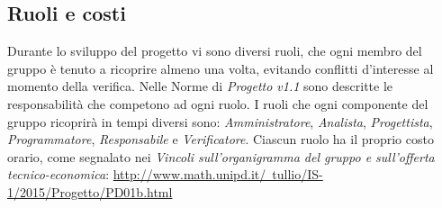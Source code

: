 \subsection{Ruoli e costi}
Durante lo sviluppo del progetto vi sono diversi ruoli, che ogni membro del gruppo è tenuto a ricoprire almeno una volta, evitando conflitti d’interesse al momento della verifica. Nelle Norme di \textit{Progetto v1.1} sono descritte le responsabilità che competono ad ogni ruolo. I ruoli che ogni componente del gruppo ricoprirà in tempi diversi sono: \textit{Amministratore}, \textit{Analista}, \textit{Progettista}, \textit{Programmatore}, \textit{Responsabile} e \textit{Verificatore}.
Ciascun ruolo ha il proprio costo orario, come segnalato nei \textit{Vincoli sull’organigramma del gruppo e sull’offerta tecnico-economica}:
\href{http://www.math.unipd.it/~tullio/IS-1/2015/Progetto/PD01b.html}{http://www.math.unipd.it/~tullio/IS-1/2015/Progetto/PD01b.html}


